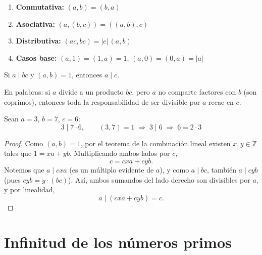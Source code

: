 \documentclass[12pt,a4paper]{book}
\begin{document}
  \begin{teorema}
    \begin{enumerate}[label=\roman*)]
      \item \textbf{Conmutativa:} $(a,b)=(b,a)$
      \item \textbf{Asociativa:} $(a,(b,c)) = ((a,b),c)$
      \item \textbf{Distributiva:} $(ac,bc) = |c|\,(a,b)$
      \item \textbf{Casos base:} $(a,1)=(1,a)=1$, \qquad $(a,0)=(0,a)=|a|$
    \end{enumerate}
  \end{teorema}
  
  \begin{lema}
    Si $a\mid bc$ y $(a,b)=1$, entonces $a\mid c$.
  \end{lema}
  
  En palabras: si $a$ divide a un producto $bc$, pero $a$ no comparte factores con $b$ (son coprimos), entonces toda la responsabilidad de ser divisible por $a$ recae en $c$.
  
  \begin{ejemplo}
    Sean $a=3$, $b=7$, $c=6$:
    \begin{equation*}
      3 \mid 7\cdot 6, \qquad (3,7)=1 \;\Longrightarrow\; 3\mid 6 \;\Longrightarrow\; 6=2\cdot 3
    \end{equation*}
  \end{ejemplo}
  
  \begin{proof}
    Como $(a,b)=1$, por el teorema de la combinación lineal existen $x,y\in\mathbb{Z}$ tales que $1=xa+yb$. Multiplicando ambos lados por $c$,
    \begin{equation*}
      c = cxa+cyb.
    \end{equation*}
    Notemos que $a\mid cxa$ (es un múltiplo evidente de $a$), y como $a\mid bc$, también $a\mid cyb$ (pues $cyb=y\cdot(bc)$). Así, ambos sumandos del lado derecho son divisibles por $a$, y por linealidad,
    \begin{equation*}
      a \mid (cxa+cyb) = c.
    \end{equation*}
  \end{proof}
  
  \section{Infinitud de los números primos}
  
\end{document}
